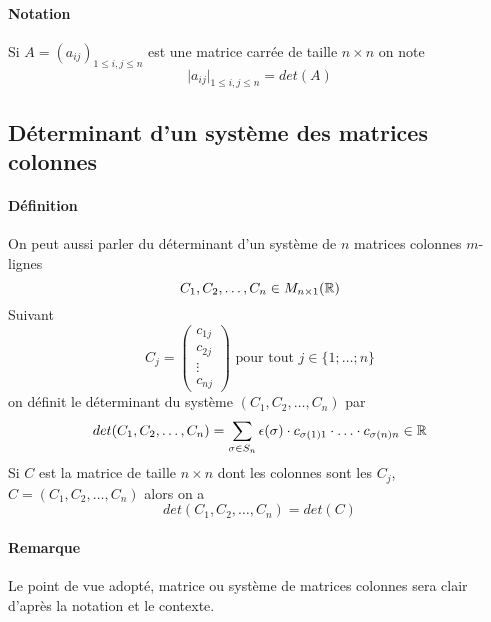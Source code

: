 \paragraph{Notation} Si $A = (a_{ij})_{1 \leq i, j\leq n}$ est une matrice carrée de taille $n\times n$ on note
$$\vert a_{ij} \vert _{1 \leq i, j \leq n} = det(A)$$

%
\subsection{Déterminant d'un système des matrices colonnes}
%
\paragraph{Définition} On peut aussi parler du déterminant d'un système de $n$ matrices colonnes $m$-lignes
$$C_1, C_2, \ldots, C_n  \in M_{n\times 1}(\mathbb{R})$$
Suivant
$$C_{j} = \begin{pmatrix} c_{1j} \\ c_{2j} \\ \vdots \\ c_{nj} \end{pmatrix} \text{ pour tout } j \in \{1; \ldots ; n\}$$
on définit le déterminant du système $(C_1, C_2, \ldots, C_n)$ par
$$det(C_1, C_2, \ldots, C_n) = \sum_{\sigma \in S_n} \epsilon(\sigma) \cdot c_{\sigma(1) 1} \cdot \ldots \cdot c_{\sigma(n) n} \in \mathbb{R}$$
Si $C$ est la matrice de taille $n \times n$ dont les colonnes sont les $C_j$, $C = (C_1, C_2, \ldots, C_n)$ alors on a
$$det(C_1, C_2, \ldots, C_n) = det(C)$$
\paragraph{Remarque} Le point de vue adopté, matrice ou système de matrices colonnes sera clair d'après la notation et le contexte.

